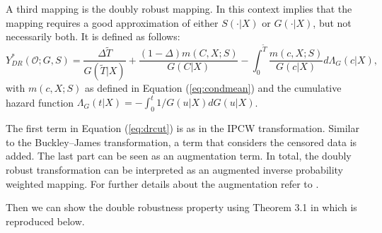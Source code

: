 \documentclass[12pt, a4paper]{scrartcl}
\theoremstyle{definition}
\theoremstyle{plain}
\numberwithin{equation}{section}
\numberwithin{figure}{section}
\numberwithin{table}{section}
\begin{document}
	A third mapping is the doubly robust mapping.
	In this context  implies that the mapping requires a good approximation of either  $S(\cdot\vert X)$ or $G(\cdot\vert X)$, but not necessarily both.
	It is defined as follows:
	\begin{equation}\label{eq:drcut}
	Y_{DR}^* (\mathcal{O}; G, S) = \frac{\Delta \tilde T}{G(\tilde T\vert X)} + \frac{(1-\Delta)m(C,X;S)}{G(C \vert X)} - \int_{0}^{\tilde T} \frac{m(c,X;S)}{G(c \vert X)} d\Lambda_G(c \vert X),
	\end{equation}
	with $m(c,X;S)$ as defined in Equation (\ref{eq:condmean}) and the cumulative hazard function $\Lambda_G(t\vert X)=-\int_{0}^{t}1/G(u\vert X)dG(u\vert X)$.
	
	The first term in Equation (\ref{eq:drcut}) is as in the IPCW transformation.
	Similar to the Buckley--James transformation, a term that considers the censored data is added.
	The last part can be seen as an augmentation term.
	In total, the doubly robust transformation can be interpreted as an augmented inverse probability weighted mapping.
	For further details about the augmentation refer to \citet*{bookfailuretime}.
		
	Then we can show the double robustness property using Theorem 3.1 in \citet*{drcut} which is reproduced below.
	
\end{document}
